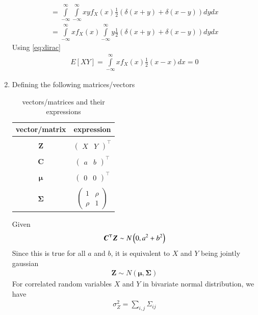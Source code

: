 \documentclass[journal,12pt,twocolumn]{IEEEtran}
\begin{document}
\begin{enumerate}
\begin{align}
=\int\limits_{-\infty}^{\infty}\int\limits_{-\infty}^{\infty}xyf_X(x)\frac{1}{2}(\delta(x+y)+\delta(x-y)) dy dx\\
=\int\limits_{-\infty}^{\infty} xf_X(x)\int\limits_{-\infty}^{\infty}y\frac{1}{2}(\delta(x+y)+\delta(x-y)) dy dx
\end{align}
Using \eqref{eq:dirac}
\begin{align}
E[XY]=\int\limits_{-\infty}^{\infty}xf_X(x)\frac{1}{2}(x-x)dx=0
\end{align}
\item
Defining the following matrices/vectors
\begin{table}[h!]
\centering
\begin{tabular}{ |c|c|} 
\hline
\textbf{vector/matrix} & \textbf{expression} \\
\hline&\\[-1em]
$\boldsymbol{Z}$& $\begin{pmatrix} X &Y\end{pmatrix}^\top$\\[2pt]
\hline&\\[-1em]
$\boldsymbol{C}$&$\begin{pmatrix} a &b\end{pmatrix}^\top$  \\[2pt]
\hline&\\[-1em]
$\boldsymbol{\mu}$&$\begin{pmatrix} 0 &0\end{pmatrix}^\top$  \\[2pt]
\hline&\\[-1em]
$\boldsymbol{\Sigma}$&$\begin{pmatrix}1&\rho\\\rho&1\end{pmatrix}$ \\
\hline
\end{tabular}
\caption{vectors/matrices and their expressions}
\label{table1}
\end{table}
Given
\begin{align}
\boldsymbol{C^\top Z}\sim N\left(0,a^2+b^2\right)
\end{align}
Since this is true for all $a$ and $b$, it is equivalent to $X$ and $Y$ being jointly gaussian
\begin{align}
\boldsymbol{Z}\sim N(\boldsymbol{\mu},\boldsymbol{\Sigma})
\end{align}
For correlated random variables $X$ and $Y$ in bivariate normal distribution, we have
\begin{align}
\sigma_{Z}^2=\displaystyle\sum_{i,j}\Sigma_{ij}\\

\end{align}
\end{enumerate}
\end{document}
